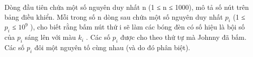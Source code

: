 Dòng đầu tiên chứa một số nguyên duy nhất n (1 ≤ n ≤ 1000), mô tả số nút trên bảng điều khiển. Mỗi trong số n dòng sau chứa một số nguyên duy nhất $p_{i}$   (1 ≤ $p_{i}$   ≤ $10^{9}$   ), cho biết rằng bấm nút thứ i sẽ làm các bóng đèn có số hiệu là bội số của $p_{i}$   sáng lên với màu $k_{i}$   . Các số $p_{i}$   được cho theo thứ tự mà Johnny đã bấm. Các số $p_{i}$   đôi một nguyên tố cùng nhau (và do đó phân biệt).